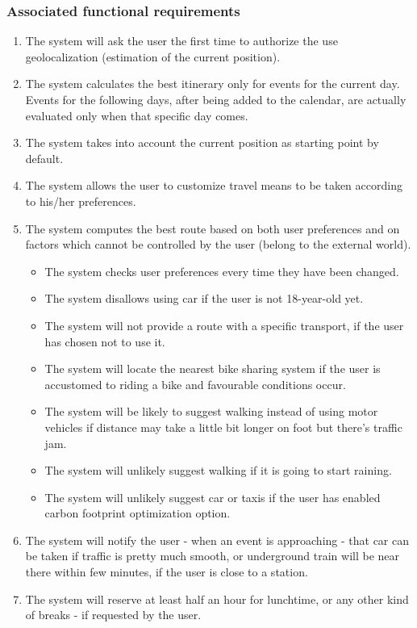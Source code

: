 \subsubsection{Associated functional requirements}
\begin{enumerate}
\item The system will ask the user the first time to authorize the use geolocalization (estimation of the current position).
\item The system calculates the best itinerary only for events for the current day. Events for the following days, after being added to the calendar, are actually evaluated only when that specific day comes.
\item The system takes into account the current position as starting point by default.
\item The system allows the user to customize travel means to be taken according to his/her preferences.
\item The system computes the best route based on both user preferences and on factors which cannot be controlled by the user (belong to the external world).
\begin{itemize}
\item The system checks user preferences every time they have been changed.
\item The system disallows using car if the user is not 18-year-old yet.
\item The system will not provide a route with a specific transport, if the user has chosen not to use it.
\item The system will locate the nearest bike sharing system if the user is accustomed to riding a bike and favourable conditions occur.
\item The system will be likely to suggest walking instead of using motor vehicles if distance may take a little bit longer on foot but there's traffic jam.
\item The system will unlikely suggest walking if it is going to start raining.
\item The system will unlikely suggest car or taxis if the user has enabled carbon footprint optimization option.
\end{itemize}
\item The system will notify the user - when an event is approaching - that car can be taken if traffic is pretty much smooth, or underground train will be near there within few minutes, if the user is close to a station.
\item The system will reserve at least half an hour for lunchtime, or any other kind of breaks - if requested by the user.
\end{enumerate}

